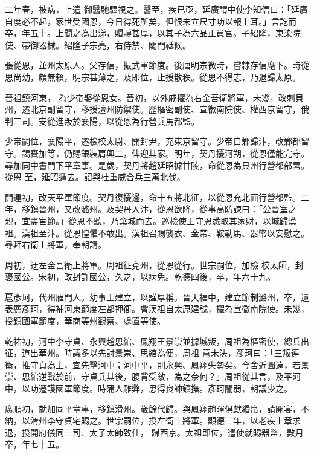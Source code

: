 \begin{pinyinscope}
 二年春，被病，上遣
 御醫馳驛視之。醫至，疾已亟，延廣謂中使李知信曰：「延廣自度必不起，家世受國恩，今日得死所矣，但恨未立尺寸功以報上耳。」言訖而卒，年五十。上聞之為出涕，賵賻甚厚，以其子為六品正員官。子紹隆，東染院使、帶御器械。紹隆子宗亮，右侍禁、閣門祗候。



 張從恩，並州太原人。父存信，振武軍節度。後唐明宗微時，嘗隸存信麾下。時從恩尚幼，頗無賴，明宗甚薄之，及即位，止授散秩。從恩不得志，乃退歸太原。



 晉祖鎮河東，
 為少帝娶從恩女。晉初，以外戚擢為右金吾衛將軍，未幾，改刺貝州，遷北京副留守，移授澶州防禦使。歷樞密副使、宣徽南院使、權西京留守，俄判三司。安從進叛於襄陽，以從恩為行營兵馬都監。



 少帝嗣位，襄陽平，遷檢校太尉、開封尹，充東京留守。少帝自鄴歸汴，改鄴都留守。錫賚加等，仍賜銀裝肩輿二，俾迎其家。明年，契丹擾河朔，從恩僅能完守。尋加同中書門下平章事。是歲，契丹將趙延昭據甘陵，命從恩為貝州行營都部署。從恩
 至，延昭遁去。詔與杜重威合兵三萬北伐。



 開運初，改天平軍節度。契丹復擾邊，命十五將北征，以從恩充北面行營都監。二年，移鎮晉州，又改潞州。及契丹入汴，從恩欲降，從事高防諫曰：「公晉室之親，宜盡宦節。」從恩不聽，乃棄城而去。巡檢使王守恩悉取其家財，以城歸漢祖。漢祖至汴。從恩惶懼不敢出。漢祖召賜襲衣、金帶、鞍勒馬、器幣以安慰之。尋拜右衛上將軍，奉朝請。



 周初，迂左金吾衛上將軍。周祖征兗州，從恩從行。世宗嗣位，加檢
 校太師，封褒國公。宋初，改封許國公，久之，以病免。乾德四後，卒，年六十九。



 扈彥珂，代州雁門人。幼事王建立，以謹厚稱。晉天福中，建立節制潞州，卒，遺表薦彥珂，得補河東節度左都押衙。會漢祖自太原建號，擢為宣徽南院使。未幾，授鎮國軍節度，華商等州觀察、處置等使。



 乾祐初，河中李守貞、永興趙思綰、鳳翔王景崇並據城叛，周祖為樞密使，總兵出征，道出華州。時議多以先討景崇、思綰為便，周祖
 意未決，彥珂曰：「三叛連衡，推守貞為主，宜先擊河中；河中平，則永興、鳳翔失勢矣。今舍近圖遠，若景崇、思綰逆戰於前，守貞兵其後，腹背受敵，為之奈何？」周祖從其言，及平河中，以功遷護國軍節度。時蒲人雕弊，思得良帥鎮撫。彥珂闇弱，朝議少之。



 廣順初，就加同平章事，移鎮滑州。歲餘代歸。與鳳翔趙暉俱獻緡帛，請開宴，不納，以滑州李守貞宅賜之。世宗嗣位，授左衛上將軍。顯德三年，以老疾上章求退，授開府儀同三司、太子太師致仕，
 歸西京。太祖即位，遣使就賜器幣，數月卒，年七十五。




\end{pinyinscope}

